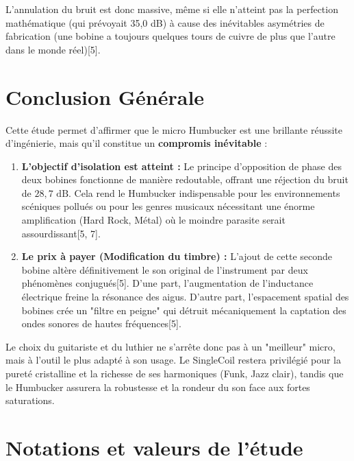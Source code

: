 \documentclass[11pt, a4paper]{article}
\begin{document}
L'annulation du bruit est donc massive, même si elle n'atteint pas la perfection mathématique (qui prévoyait 35,0 dB) à cause des inévitables asymétries de fabrication (une bobine a toujours quelques tours de cuivre de plus que l'autre dans le monde réel)[5].

\section{Conclusion Générale}

Cette étude permet d'affirmer que le micro Humbucker est une brillante réussite d'ingénierie, mais qu'il constitue un \textbf{compromis inévitable} :

\begin{enumerate}
    \item \textbf{L'objectif d'isolation est atteint :} Le principe d'opposition de phase des deux bobines fonctionne de manière redoutable, offrant une réjection du bruit de $28,7\text{ dB}$. Cela rend le Humbucker indispensable pour les environnements scéniques pollués ou pour les genres musicaux nécessitant une énorme amplification (Hard Rock, Métal) où le moindre parasite serait assourdissant[5, 7].
    \item \textbf{Le prix à payer (Modification du timbre) :} L'ajout de cette seconde bobine altère définitivement le son original de l'instrument par deux phénomènes conjugués[5]. D'une part, l'augmentation de l'inductance électrique freine la résonance des aigus. D'autre part, l'espacement spatial des bobines crée un "filtre en peigne" qui détruit mécaniquement la captation des ondes sonores de hautes fréquences[5].
\end{enumerate}

Le choix du guitariste et du luthier ne s'arrête donc pas à un "meilleur" micro, mais à l'outil le plus adapté à son usage. Le SingleCoil restera privilégié pour la pureté cristalline et la richesse de ses harmoniques (Funk, Jazz clair), tandis que le Humbucker assurera la robustesse et la rondeur du son face aux fortes saturations.

\newpage
\section{Notations et valeurs de l'étude}
\end{document}
